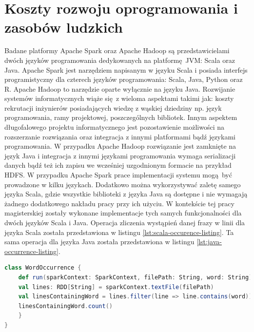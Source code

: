 \section{Koszty rozwoju oprogramowania i zasobów ludzkich}
Badane platformy Apache Spark oraz Apache Hadoop są przedstawicielami dwóch języków programowania dedykowanych na platformę JVM: Scala oraz Java. Apache Spark jest narzędziem napisanym w języku Scala i posiada interfejs programistyczny dla czterech języków programowania: Scala, Java, Python oraz R. Apache Hadoop to narzędzie oparte wyłącznie na języku Java. Rozwijanie systemów informatycznych wiąże się z wieloma aspektami takimi jak: koszty rekrutacji inżynierów posiadających wiedzę z wąskiej dziedziny np. język programowania, ramy projektowej, poszczególnych bibliotek. Innym aspektem długofalowego projektu informatycznego jest pozostawienie możliwości na rozszerzanie rozwiązania oraz integracja z innymi platformami bądź językami programowania. W przypadku Apache Hadoop rozwiązanie jest zamknięte na język Java i integracja z innymi językami programowania wymaga serializacji danych bądź też ich zapisu we wcześniej uzgodnionym formacie na przykład HDFS. W przypadku Apache Spark prace implementacji systemu mogą być prowadzone w kilku językach. Dodatkowo można wykorzystywać zaletę samego języka Scala, gdzie wszystkie biblioteki z języka Java są dostępne i nie wymagają żadnego dodatkowego nakładu pracy przy ich użyciu. W kontekście tej pracy magisterskiej zostały wykonane implementacje tych samych funkcjonalności dla dwóch języków Scala i Java. Operacja zliczenia wystąpień danej frazy w linii dla języka Scala została przedstawiona w listingu \ref{lst:scala-occurence-listing}. Ta sama operacja dla języka Java została przedstawiona w listingu \ref{lst:java-occurrence-listing}.
\begin{lstlisting}[language=scala, caption={Operacja zliczania wystąpień danej frazy w linii dla języka Scala na platformie Apache Spark},captionpos=b, label={lst:scala-occurence-listing}]
class WordOccurrence {
	def run(sparkContext: SparkContext, filePath: String, word: String) = {
	val lines: RDD[String] = sparkContext.textFile(filePath)
	val linesContainingWord = lines.filter(line => line.contains(word))
	linesContainingWord.count()
	}
}
\end{lstlisting}
